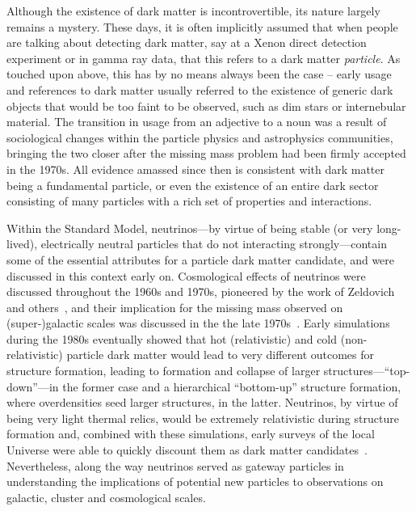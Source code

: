 Although the existence of dark matter is incontrovertible, its nature largely remains a mystery. These days, it is often implicitly assumed that when people are talking about detecting dark matter, say at a Xenon direct detection experiment or in gamma ray data, that this refers to a dark matter \emph{particle}. As touched upon above, this has by no means always been the case -- early usage and references to dark matter usually referred to the existence of generic dark objects that would be too faint to be observed, such as dim stars or internebular material. The transition in usage from an adjective to a noun was a result of sociological changes within the particle physics and astrophysics communities, bringing the two closer after the missing mass problem had been firmly accepted in the 1970s. All evidence amassed since then is consistent with dark matter being a fundamental particle, or even the existence of an entire dark sector consisting of many particles with a rich set of properties and interactions.

Within the Standard Model, neutrinos---by virtue of being stable (or very long-lived), electrically neutral particles that do not interacting strongly---contain some of the essential attributes for a particle dark matter candidate, and were discussed in this context early on. Cosmological effects of neutrinos were discussed throughout the 1960s and 1970s, pioneered by the work of Zeldovich and others~\cite{Gershtein:1966gg,PhysRevLett.29.669}, and their implication for the missing mass observed on (super-)galactic scales was discussed in the the late 1970s~\cite{PhysRevLett.39.165,1978ApJ...223.1015G}. Early simulations during the 1980s eventually showed that hot (relativistic) and cold (non-relativistic) particle dark matter would lead to very different outcomes for structure formation, leading to formation and collapse of larger structures---``top-down''---in the former case and a hierarchical ``bottom-up'' structure formation, where overdensities seed larger structures, in the latter. Neutrinos, by virtue of being very light thermal relics, would be extremely relativistic during structure formation and, combined with these simulations, early surveys of the local Universe were able to quickly discount them as dark matter candidates~\cite{1983ApJ...274L...1W}. Nevertheless, along the way neutrinos served as gateway particles in understanding the implications of potential new particles to observations on galactic, cluster and cosmological scales.

